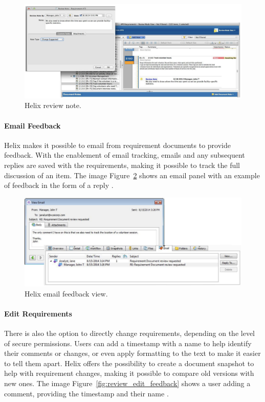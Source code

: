 \begin{figure}[htbp]
    \centering
    \includegraphics[width=\linewidth]{images/review-notes}
    \caption{Helix review note.}
    \label{fig:review_notes}
\end{figure}


\paragraph{Email Feedback}
Helix makes it possible to email from requirement documents to 
provide feedback. With the enablement of email tracking, 
emails and any subsequent replies are saved with the requirements, 
making it possible to track the full discussion of an item.
The image Figure~\ref{fig:review_email} shows an email panel with an example of feedback in the form of a reply \cite{perforce_2024}.

\begin{figure}[htbp]
    \centering
    \includegraphics[width=\linewidth]{images/email-feedback}
    \caption{Helix email feedback view.}
    \label{fig:review_email}
\end{figure}

\paragraph{Edit Requirements}
There is also the option to directly change requirements, 
depending on the level of secure permissions. Users can add a 
timestamp with a name to help identify their comments or changes, 
or even apply formatting to the text to make it easier to tell them apart. 
Helix offers the possibility to create a document snapshot to help with requirement changes, 
making it possible to compare old versions with new ones.
The image Figure~\ref{fig:review_edit_feedback} shows a user adding a comment, providing  the timestamp and their name \cite{perforce_2024}.

